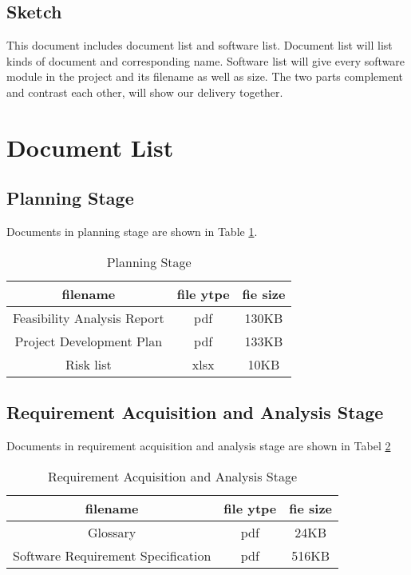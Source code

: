 \documentclass[10pt]{article}
\begin{document}
\subsection{Sketch}
This document includes document list and software list. Document list will list kinds of document and corresponding name. Software list will give every software module in the project and its filename as well as size. The two parts complement and contrast each other, will show our delivery together.

\section{Document List}
\subsection{Planning Stage}
Documents in planning stage are shown in Table \ref{Planning Stage}.
\begin{table}[htb]
	\centering 

	\begin{tabular}{c|c|c} 
		\hline 
		filename&file ytpe&fie size\\
		\hline  
Feasibility Analysis Report&pdf&130KB\\
\hline
Project Development Plan&pdf&133KB\\
\hline
Risk list&xlsx&10KB\\
\hline
\end{tabular}

\caption{Planning Stage}
\label{Planning Stage}
\end{table}

\subsection{Requirement Acquisition and Analysis Stage}
Documents in requirement acquisition and analysis stage are shown in Tabel \ref{Requirement Acquisition and Analysis Stage}
\begin{table}[htb]
	\centering

	\begin{tabular}{c|c|c} 
		\hline 
		filename&file ytpe&fie size\\
		\hline  
Glossary&pdf&24KB\\
\hline
Software Requirement Specification&pdf&516KB\\
\hline
\end{tabular} 
\caption{Requirement Acquisition and Analysis Stage}
\label{Requirement Acquisition and Analysis Stage}
\end{table}
\end{document}
